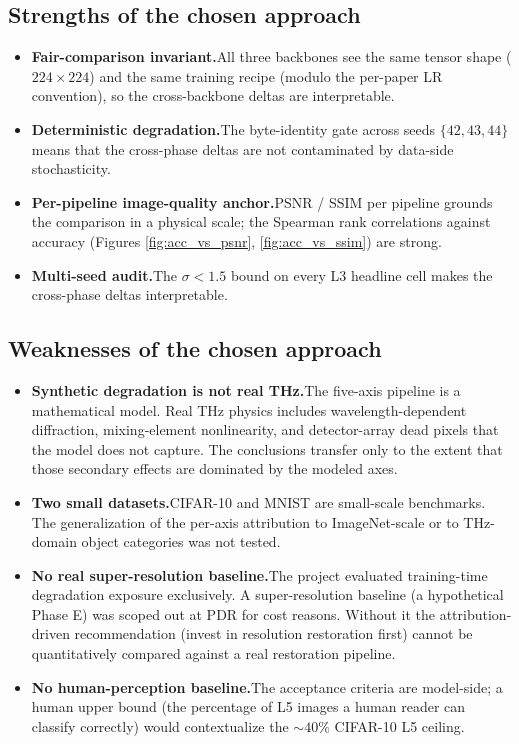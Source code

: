 \subsection{Strengths of the chosen approach}
\begin{itemize}
  \item \textbf{Fair-comparison invariant.}\quad All three backbones see
        the same tensor shape ($224 \times 224$) and the same training
        recipe (modulo the per-paper LR convention), so the cross-backbone
        deltas are interpretable.
  \item \textbf{Deterministic degradation.}\quad The byte-identity gate
        across seeds $\{42, 43, 44\}$ means that the cross-phase deltas
        are not contaminated by data-side stochasticity.
  \item \textbf{Per-pipeline image-quality anchor.}\quad PSNR / SSIM
        per pipeline grounds the comparison in a physical scale; the
        Spearman rank correlations against accuracy (Figures
        \ref{fig:acc_vs_psnr}, \ref{fig:acc_vs_ssim}) are strong.
  \item \textbf{Multi-seed audit.}\quad The $\sigma < 1.5$ \Mpp{}
        bound on every L3 headline cell makes the cross-phase
        deltas interpretable.
\end{itemize}

\subsection{Weaknesses of the chosen approach}
\begin{itemize}
  \item \textbf{Synthetic degradation is not real THz.}\quad The
        five-axis pipeline is a mathematical model. Real THz physics
        includes wavelength-dependent diffraction, mixing-element
        nonlinearity, and detector-array dead pixels that the model
        does not capture. The conclusions transfer only to the extent
        that those secondary effects are dominated by the modeled
        axes.
  \item \textbf{Two small datasets.}\quad CIFAR-10 and MNIST are
        small-scale benchmarks. The generalization of the per-axis
        attribution to ImageNet-scale or to THz-domain object
        categories was not tested.
  \item \textbf{No real super-resolution baseline.}\quad The project
        evaluated training-time degradation exposure exclusively. A
        super-resolution baseline (a hypothetical Phase E) was scoped
        out at PDR for cost reasons. Without it the
        attribution-driven recommendation (invest in resolution
        restoration first) cannot be quantitatively compared
        against a real restoration pipeline.
  \item \textbf{No human-perception baseline.}\quad The acceptance
        criteria are model-side; a human upper bound (the percentage
        of L5 images a human reader can classify correctly) would
        contextualize the $\sim 40\%$ CIFAR-10 L5 ceiling.
\end{itemize}

